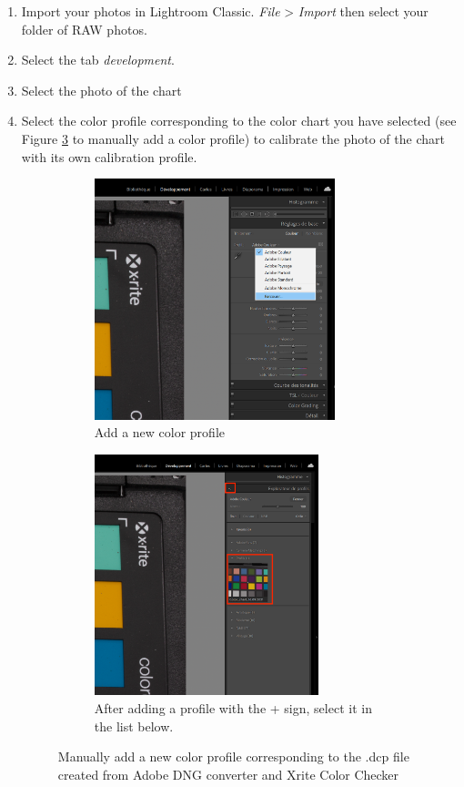 \documentclass[10pt,letter,english]{article}
\begin{document}
\begin{enumerate}
    \item Import your photos in Lightroom Classic. \textit {File} > \textit{Import} then select your folder of RAW photos.
    \item Select the tab \textit{development}.
    \item Select the photo of the chart
    \item Select the color profile corresponding to the color chart you have selected (see Figure \ref{color profile} to manually add a color profile) to calibrate the photo of the chart with its own calibration profile.
    
\begin{figure}[H]
\centering
\begin{subfigure}[t]{0.45\textwidth}
  \centering
  \includegraphics[height=7cm]{Figures/profil_capture_1.png}
  \caption{Add a new color profile}
  \label{add_profile}
\end{subfigure}%
\hspace{10pt}
\begin{subfigure}[t]{0.4\textwidth}
  \centering
  \includegraphics[height=7cm]{Figures/profil_capture_2.png}
  \caption{After adding a profile with the + sign, select it in the list below.}
  \label{settings_synchronize}
\end{subfigure}
\caption{Manually add a new color profile corresponding to the .dcp file created from Adobe DNG converter and Xrite Color Checker}
\label{color profile}
\end{figure}
    

\end{enumerate}
\end{document}
